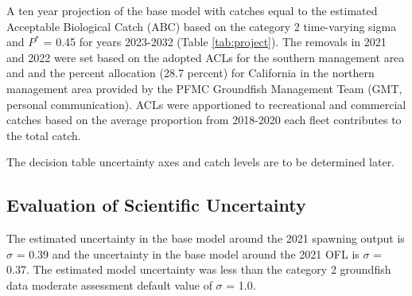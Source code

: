 \documentclass[11pt,
  english,
  a4paper,
]{article}
\begin{document}
\leavevmode\tagmcend\tagstructend


A ten year projection of the base model with catches equal to the estimated Acceptable Biological Catch (ABC) based on the category 2 time-varying sigma and {\(P^*\)\leavevmode\tagmcend\tagstructend} = 0.45 for years 2023-2032 (Table \ref{tab:project}). The removals in 2021 and 2022 were set based on the adopted ACLs for the southern management area and and the percent allocation (28.7 percent) for California in the northern management area provided by the PFMC Groundfish Management Team (GMT, personal communication). ACLs were apportioned to recreational and commercial catches based on the average proportion from 2018-2020 each fleet contributes to the total catch.

\leavevmode\tagmcend\tagstructend\par


The decision table uncertainty axes and catch levels are to be determined later.

\leavevmode\tagmcend\tagstructend\par


\hypertarget{evaluation-of-scientific-uncertainty}{%
\subsection{Evaluation of Scientific Uncertainty}\label{evaluation-of-scientific-uncertainty}}

\leavevmode\tagmcend\tagstructend


The estimated uncertainty in the base model around the 2021 spawning output is {\(\sigma\)\leavevmode\tagmcend\tagstructend} = 0.39 and the uncertainty in the base model around the 2021 OFL is {\(\sigma\)\leavevmode\tagmcend\tagstructend} = 0.37. The estimated model uncertainty was less than the category 2 groundfish data moderate assessment default value of {\(\sigma\)\leavevmode\tagmcend\tagstructend} = 1.0.

\leavevmode\tagmcend\tagstructend\par
\end{document}
